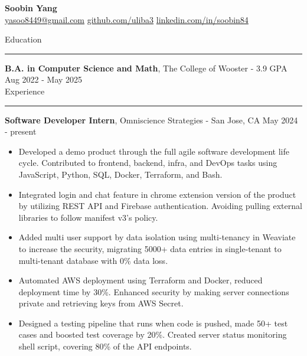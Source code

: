 \documentclass[letterpaper,12pt]{article}
\begin{document}
\linespread{1}\selectfont
{}
\newcommand{\sectionrule}[1]{
  \vspace{5pt}
  \RaggedRight
  {\large\textnormal{#1}}
  \hrule
  \vspace{3pt}
}
\pagestyle{empty}

\begin{center}
    \textbf{\Large Soobin Yang}\\
    \faEnvelope \href{mailto:yasoo8449@gmail.com}{ yasoo8449@gmail.com} \hspace{1pt}
    \faGithubSquare \href{https://github.com/uliba3}{ github.com/uliba3} \hspace{1pt}
    \faLinkedinSquare \href{https://linkedin.com/in/soobin84}{ linkedin.com/in/soobin84}
\end{center}

\vspace{-10pt}

\sectionrule{Education}
\textbf{B.A. in Computer Science and Math}\textnormal{, The College of Wooster - 3.9 GPA} \hfill \textnormal{Aug 2022 - May 2025}\\

\sectionrule{Experience}
\textbf{Software Developer Intern}\textnormal{, Omniscience Strategies - San Jose, CA} \hfill \textnormal{May 2024 - present}\\
\begin{itemize}
    \item Developed a demo product through the full agile software development life cycle. Contributed to frontend, backend, infra, and DevOps tasks using JavaScript, Python, SQL, Docker, Terraform, and Bash.
    \item Integrated login and chat feature in chrome extension version of the product by utilizing REST API and Firebase authentication. Avoiding pulling external libraries to follow manifest v3's policy.
    \item Added multi user support by data isolation using multi-tenancy in Weaviate to increase the security, migrating 5000+ data entries in single-tenant to multi-tenant database with 0\% data loss.
    \item Automated AWS deployment using Terraform and Docker, reduced deployment time by 30\%. Enhanced security by making server connections private and retrieving keys from AWS Secret.
    \item Designed a testing pipeline that runs when code is pushed, made 50+ test cases and boosted test coverage by 20\%. Created server status monitoring shell script, covering 80\% of the API endpoints.
\end{itemize}
\end{document}
